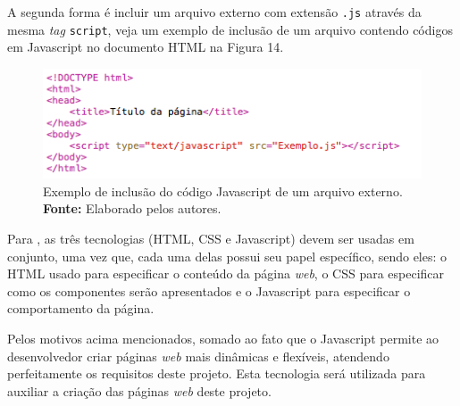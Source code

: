 A segunda forma é incluir um arquivo externo com extensão \texttt{.js} através da mesma \textit{tag} \texttt{script}, veja um exemplo de inclusão de um arquivo contendo códigos em Javascript no documento HTML na Figura 14.

\begin{figure}[h!]
	\centerline{\includegraphics[scale=0.8]{./imagens/javascript_include.png}}
	\caption[Exemplo de inclusão do código Javascript de um arquivo externo]
	{Exemplo de inclusão do código Javascript de um arquivo externo. \textbf{Fonte:} Elaborado pelos autores.}
	\label{fig:exemplo1}
\end{figure}

Para , as três tecnologias (HTML, CSS e Javascript) devem ser usadas em conjunto, uma vez que, cada uma delas possui seu papel específico, sendo eles: o HTML usado para especificar o conteúdo da página \textit{web}, o CSS para especificar como os componentes serão apresentados e o Javascript para especificar o comportamento da página.

Pelos motivos acima mencionados, somado ao fato que o Javascript permite ao desenvolvedor criar páginas \textit{web} mais dinâmicas e flexíveis, atendendo perfeitamente os requisitos deste projeto. Esta tecnologia será utilizada para auxiliar a criação das páginas \textit{web} deste projeto.